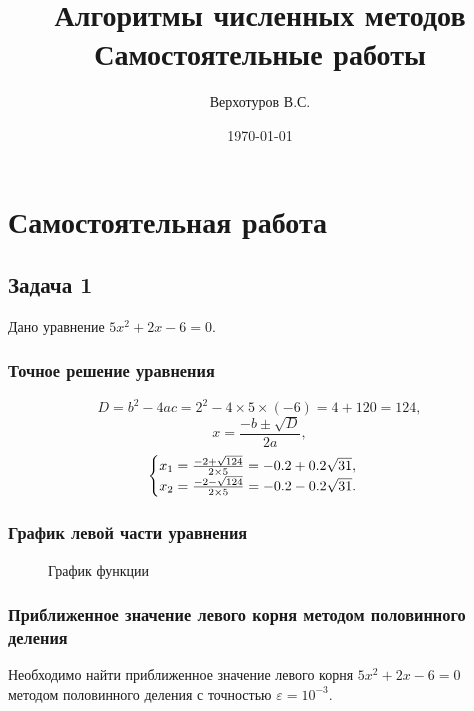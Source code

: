 \documentclass[10pt, a4paper, titlepage]{article}
\title{Алгоритмы численных методов \\ Самостоятельные работы}
\author{Верхотуров В.С.}
\affil{БСБО-05-20}
\affil{РТУ МИРЭА}
\date\today
\begin{document}
\maketitle

\section{Самостоятельная работа }

\subsection{Задача 1}

Дано уравнение $5x^2+2x-6=0$.

\subsubsection{Точное решение уравнения}
$$D=b^2-4ac=2^2-4\times5\times(-6)=4+120=124,$$
$$x=\frac{-b\pm\sqrt{D}}{2a},$$
\begin{equation*}
    \begin{cases}
        $$x_1=\frac{-2+\sqrt{124}}{2\times5}=-0.2+0.2\sqrt{31},$$ \\
        $$x_2=\frac{-2-\sqrt{124}}{2\times5}=-0.2-0.2\sqrt{31}.$$
    \end{cases}
\end{equation*} 

\subsubsection{График левой части уравнения}
\begin{figure}[h]
    \centering
    \caption{График функции}
    \label{task1Function}
\end{figure}

\subsubsection{Приближенное значение левого корня методом половинного деления}
Необходимо найти приближенное значение левого корня $5x^2+2x-6=0$ методом половинного деления с точностью $\varepsilon=10^{-3}$.
\end{document}
